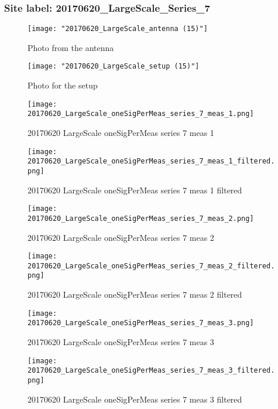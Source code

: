 \subsubsection{Site label: 20170620\_LargeScale\_Series\_7}
\begin{figure}[ht] \caption{Photo from the antenna}
\texttt{[image: "20170620\_LargeScale\_antenna (15)"]}\centering\end{figure}
\begin{figure}[ht] \caption{Photo for the setup}
\texttt{[image: "20170620\_LargeScale\_setup (15)"]}\centering\end{figure}
\begin{figure}[ht] \caption{20170620 LargeScale oneSigPerMeas series 7 meas 1}
\texttt{[image: 20170620\_LargeScale\_oneSigPerMeas\_series\_7\_meas\_1.png]}\centering\end{figure}
\begin{figure}[ht] \caption{20170620 LargeScale oneSigPerMeas series 7 meas 1 filtered}
\texttt{[image: 20170620\_LargeScale\_oneSigPerMeas\_series\_7\_meas\_1\_filtered.png]}\centering\end{figure}
\begin{figure}[ht] \caption{20170620 LargeScale oneSigPerMeas series 7 meas 2}
\texttt{[image: 20170620\_LargeScale\_oneSigPerMeas\_series\_7\_meas\_2.png]}\centering\end{figure}
\begin{figure}[ht] \caption{20170620 LargeScale oneSigPerMeas series 7 meas 2 filtered}
\texttt{[image: 20170620\_LargeScale\_oneSigPerMeas\_series\_7\_meas\_2\_filtered.png]}\centering\end{figure}
\begin{figure}[ht] \caption{20170620 LargeScale oneSigPerMeas series 7 meas 3}
\texttt{[image: 20170620\_LargeScale\_oneSigPerMeas\_series\_7\_meas\_3.png]}\centering\end{figure}
\begin{figure}[ht] \caption{20170620 LargeScale oneSigPerMeas series 7 meas 3 filtered}
\texttt{[image: 20170620\_LargeScale\_oneSigPerMeas\_series\_7\_meas\_3\_filtered.png]}\centering\end{figure}
\clearpage

